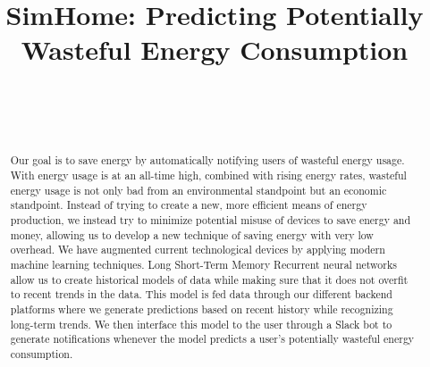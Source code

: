 \documentclass[conference]{IEEEtran}
\begin{document}
\title{SimHome: Predicting Potentially Wasteful Energy Consumption}


\author{
 \\

\and
{}
 \\ %

\and
{}
}
\maketitle


\begin{abstract}
Our goal is to save energy by automatically notifying users of wasteful energy usage. With energy usage is at an all-time high, combined with rising energy rates, wasteful energy usage is not only bad from an environmental standpoint but an economic standpoint. Instead of trying to create a new, more efficient means of energy production, we instead try to minimize potential misuse of devices to save energy and money, allowing us to develop a new technique of saving energy with very low overhead. We have augmented current technological devices by applying modern machine learning techniques. Long Short-Term Memory Recurrent neural networks allow us to create historical models of data while making sure that it does not overfit to recent trends in the data. This model is fed data through our different backend platforms where we generate predictions based on recent history while recognizing long-term trends. We then interface this model to the user through a Slack bot to generate notifications whenever the model predicts a user's potentially wasteful energy consumption.
\end{abstract}
\end{document}
